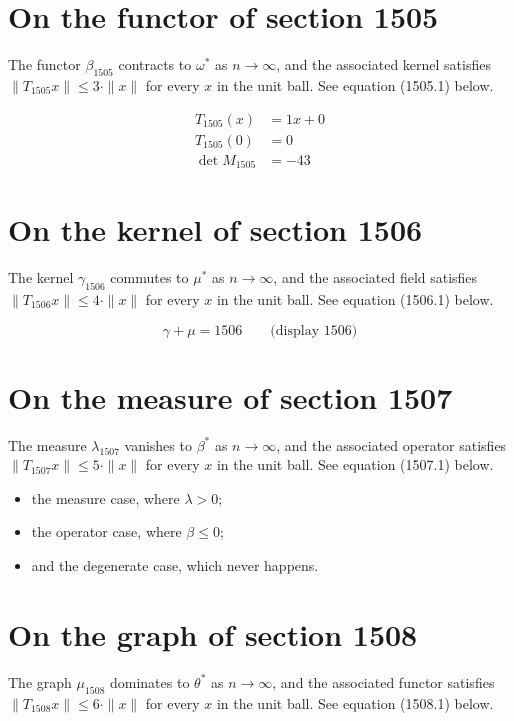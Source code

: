 \documentclass{article}
\begin{document}
\section{On the functor of section 1505}
The functor $\beta_{1505}$ contracts to $\omega^{*}$ as $n \to \infty$,
and the associated kernel satisfies $\|T_{1505} x\| \leq 3 \cdot \|x\|$
for every $x$ in the unit ball. See equation (1505.1) below.

\begin{align}
T_{1505}(x) &= 1 x + 0 \\
T_{1505}(0) &= 0 \\
\det M_{1505} &= -43
\end{align}

\section{On the kernel of section 1506}
The kernel $\gamma_{1506}$ commutes to $\mu^{*}$ as $n \to \infty$,
and the associated field satisfies $\|T_{1506} x\| \leq 4 \cdot \|x\|$
for every $x$ in the unit ball. See equation (1506.1) below.

$$
\gamma + \mu = 1506 \qquad \text{(display 1506)}
$$

\section{On the measure of section 1507}
The measure $\lambda_{1507}$ vanishes to $\beta^{*}$ as $n \to \infty$,
and the associated operator satisfies $\|T_{1507} x\| \leq 5 \cdot \|x\|$
for every $x$ in the unit ball. See equation (1507.1) below.

\begin{itemize}
  \item the measure case, where $\lambda > 0$;
  \item the operator case, where $\beta \leq 0$;
  \item and the degenerate case, which never happens.
\end{itemize}

\section{On the graph of section 1508}
The graph $\mu_{1508}$ dominates to $\theta^{*}$ as $n \to \infty$,
and the associated functor satisfies $\|T_{1508} x\| \leq 6 \cdot \|x\|$
for every $x$ in the unit ball. See equation (1508.1) below.
\end{document}
